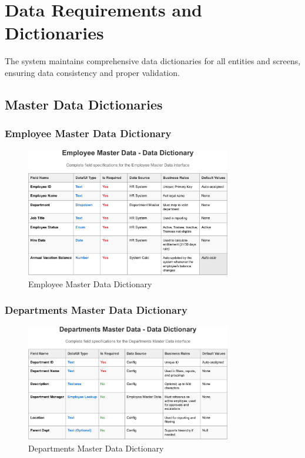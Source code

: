 \documentclass[12pt,a4paper]{article}
\begin{document}
\section{Data Requirements and Dictionaries}

The system maintains comprehensive data dictionaries for all entities and screens, ensuring data consistency and proper validation.

\subsection{Master Data Dictionaries}

\subsubsection{Employee Master Data Dictionary}
\begin{figure}[H]
\centering
\includegraphics[width=0.8\textwidth]{Data-Dictionary/Master-Data-Dictionaries/Employee-Master-Data-Data-Dictionary/Employee-Master-Data-Data-Dictionary-1.png}
\caption{Employee Master Data Dictionary}
\label{fig:employee-master-data}
\end{figure}

\subsubsection{Departments Master Data Dictionary}
\begin{figure}[H]
\centering
\includegraphics[width=0.8\textwidth]{Data-Dictionary/Master-Data-Dictionaries/Departments-Master-Data-Data-Dictionary/Departments-Master-Data-Data-Dictionary-1.png}
\caption{Departments Master Data Dictionary}
\label{fig:departments-master-data}
\end{figure}
\end{document}
